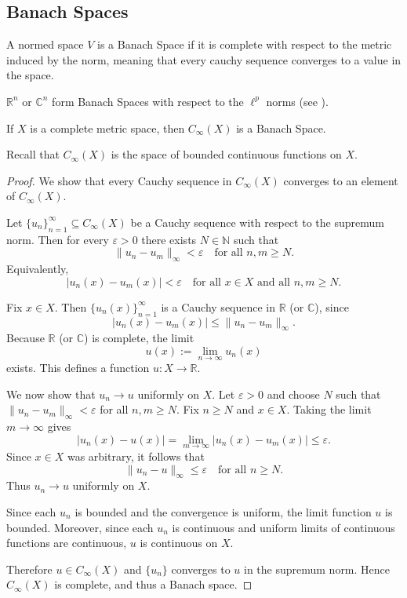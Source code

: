 \newpage 
\subsection{Banach Spaces}
\begin{defn}
    \label{defn:banach_space}
    A normed space $V$ is a Banach Space if it is 
    complete with respect to the metric induced by the norm, meaning
    that every cauchy sequence converges to a value in the 
    space. 
\end{defn}

\begin{ex} 
    $\mathbb R^n$ or $\mathbb C^n$ form Banach Spaces 
    with respect to the $\ell^p$ norms (see ).
\end{ex}

\begin{thm}
    If $X$ is a complete metric space, then 
    $C_\infty(X)$ is a Banach Space. 
\end{thm}

Recall that $C_\infty(X)$ is the space of bounded continuous 
functions on $X$.

\begin{proof}
    We show that every Cauchy sequence in $C_\infty(X)$ converges 
    to an element
    of $C_\infty(X)$.

    Let $\{u_n\}_{n=1}^\infty \subseteq C_\infty(X)$ be a Cauchy 
    sequence with
    respect to the supremum norm. Then for every $\varepsilon > 0$ 
    there exists
    $N \in \mathbb{N}$ such that
    \[
        \|u_n - u_m\|_\infty < \varepsilon \quad \text{for all } 
        n,m \ge N.
    \]
    Equivalently,
    \[
        |u_n(x) - u_m(x)| < \varepsilon
        \quad \text{for all } x \in X \text{ and all } n,m \ge N.
    \]

    Fix $x \in X$. Then $\{u_n(x)\}_{n=1}^\infty$ is a 
    Cauchy sequence in
    $\mathbb{R}$ (or $\mathbb{C}$), since
    \[
        |u_n(x) - u_m(x)| \le \|u_n - u_m\|_\infty.
    \]
    Because $\mathbb{R}$ (or $\mathbb{C}$) is complete, the limit
    \[
        u(x) := \lim_{n\to\infty} u_n(x)
    \]
    exists. This defines a function $u : X \to \mathbb{R}$.

    We now show that $u_n \to u$ uniformly on $X$. Let 
    $\varepsilon > 0$ and
    choose $N$ such that $\|u_n - u_m\|_\infty < \varepsilon$ 
    for all $n,m \ge N$.
    Fix $n \ge N$ and $x \in X$. Taking the limit $m \to \infty$ gives
    \[
        |u_n(x) - u(x)|
        = \lim_{m\to\infty} |u_n(x) - u_m(x)|
        \le \varepsilon.
    \]
    Since $x \in X$ was arbitrary, it follows that
    \[
        \|u_n - u\|_\infty \le \varepsilon \quad \text{for all } 
        n \ge N.
    \]
    Thus $u_n \to u$ uniformly on $X$.

    Since each $u_n$ is bounded and the convergence is uniform, 
    the limit
    function $u$ is bounded. Moreover, since each $u_n$ 
    is continuous and
    uniform limits of continuous functions are continuous, 
    $u$ is continuous
    on $X$.

    Therefore $u \in C_\infty(X)$ and $\{u_n\}$ converges to $u$ in the
    supremum norm. Hence $C_\infty(X)$ is complete, 
    and thus a Banach space.
\end{proof}

